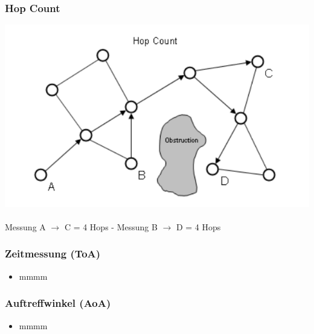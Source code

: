 \begin{frame}
  \frametitle{Hop Count }

  \begin{center}
  \includegraphics[scale=0.5]{img/hop_count1}
  \\~\\
  Messung A $\to$ C = 4 Hops - Messung B $\to$ D = 4 Hops
  \end{center}
\end{frame}

\begin{frame}
\frametitle{Zeitmessung (ToA)}

\begin{itemize}
  \item mmmm
\end{itemize}
\end{frame}

\begin{frame}
\frametitle{Auftreffwinkel (AoA)}

\begin{itemize}
  \item mmmm
\end{itemize}
\end{frame}
